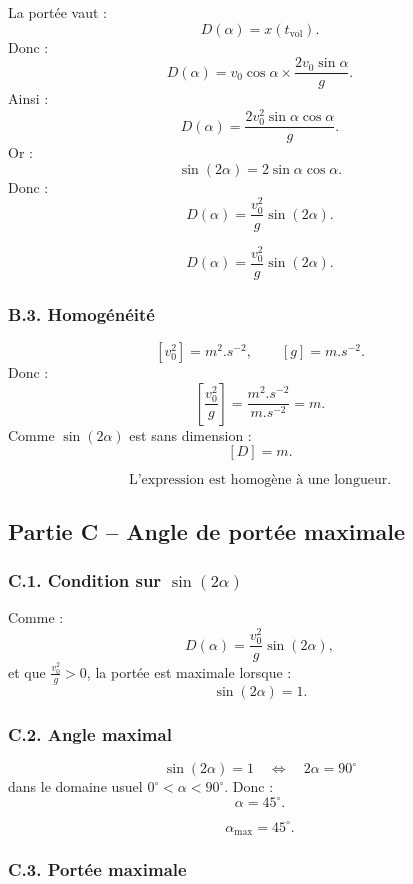 \documentclass[11pt,a4paper]{article}
\begin{document}
La portée vaut :
\[
D(\alpha)=x(t_{\text{vol}}).
\]
Donc :
\[
D(\alpha)=v_0\cos\alpha \times \frac{2v_0\sin\alpha}{g}.
\]
Ainsi :
\[
D(\alpha)=\frac{2v_0^2\sin\alpha\cos\alpha}{g}.
\]
Or :
\[
\sin(2\alpha)=2\sin\alpha\cos\alpha.
\]
Donc :
\[
D(\alpha)=\frac{v_0^2}{g}\sin(2\alpha).
\]

\begin{resultatbox}
\[
\boxed{D(\alpha)=\frac{v_0^2}{g}\sin(2\alpha).}
\]
\end{resultatbox}

\subsubsection*{B.3. Homogénéité}

\[
[v_0^2]=\si{m^2.s^{-2}},
\qquad
[g]=\si{m.s^{-2}}.
\]
Donc :
\[
\left[\frac{v_0^2}{g}\right]
=
\frac{\si{m^2.s^{-2}}}{\si{m.s^{-2}}}
=
\si{m}.
\]
Comme $\sin(2\alpha)$ est sans dimension :
\[
[D]=\si{m}.
\]

\begin{resultatbox}
\[
\boxed{\text{L'expression est homogène à une longueur.}}
\]
\end{resultatbox}

\subsection{Partie C -- Angle de portée maximale}

\subsubsection*{C.1. Condition sur $\sin(2\alpha)$}

Comme :
\[
D(\alpha)=\frac{v_0^2}{g}\sin(2\alpha),
\]
et que $\frac{v_0^2}{g}>0$, la portée est maximale lorsque :
\[
\sin(2\alpha)=1.
\]

\subsubsection*{C.2. Angle maximal}

\[
\sin(2\alpha)=1
\quad\Longleftrightarrow\quad
2\alpha=90^\circ
\]
dans le domaine usuel $0^\circ<\alpha<90^\circ$.
Donc :
\[
\alpha=45^\circ.
\]

\begin{resultatbox}
\[
\boxed{\alpha_{\max}=45^\circ.}
\]
\end{resultatbox}

\subsubsection*{C.3. Portée maximale}
\end{document}
